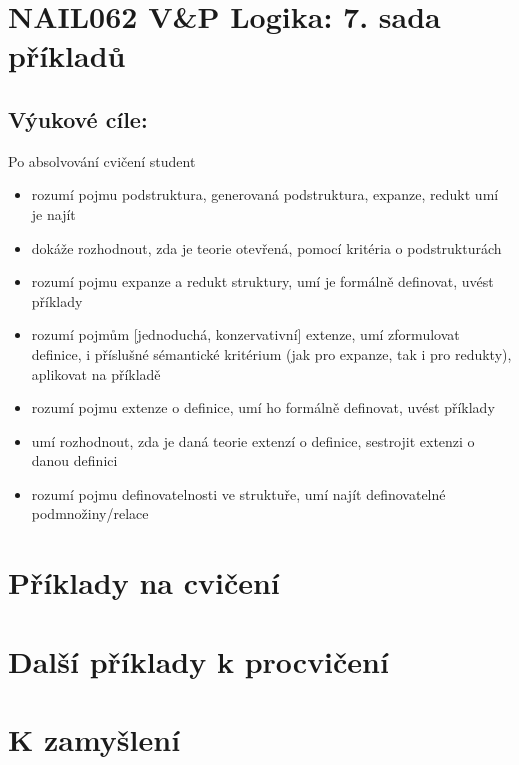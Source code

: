 \section*{NAIL062 V\&P Logika: 7. sada příkladů}


\subsection*{Výukové cíle:} Po absolvování cvičení student

    \begin{itemize}\setlength{\itemsep}{0pt}
        \item rozumí pojmu podstruktura, generovaná podstruktura, expanze, redukt umí je najít
        \item dokáže rozhodnout, zda je teorie otevřená, pomocí kritéria o podstrukturách
        \item rozumí pojmu expanze a redukt struktury, umí je formálně definovat, uvést příklady
        \item rozumí pojmům [jednoduchá, konzervativní] extenze, umí zformulovat definice, i příslušné sémantické kritérium (jak pro expanze, tak i pro redukty), aplikovat na příkladě
        \item rozumí pojmu extenze o definice, umí ho formálně definovat, uvést příklady
        \item umí rozhodnout, zda je daná teorie extenzí o definice, sestrojit extenzi o danou definici
        \item rozumí pojmu definovatelnosti ve struktuře, umí najít definovatelné podmnožiny/relace
    \end{itemize}
    

\section*{Příklady na cvičení}


\begin{problem}


    \begin{solution}
                    
    \end{solution}

\end{problem}

        
        
\section*{Další příklady k procvičení}

        
\section*{K zamyšlení}


